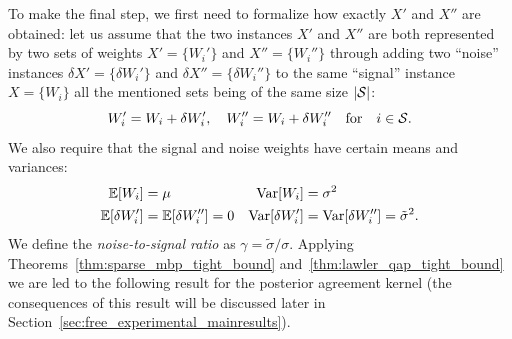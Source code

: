 To make the final step, we first need to formalize how exactly $X'$ and $X''$ are
obtained: let us assume that the two instances $X'$ and $X''$ are both
represented by two sets of weights $X' = \{W_i'\}$ and $X'' =
\{W_i''\}$ through adding two ``noise'' instances $\delta X' = \{\delta W_i'\}$
and $\delta X'' = \{\delta W_i''\}$ to the same ``signal'' instance
$X = \{W_i\}$ all the mentioned sets being of the same size $|\S|$:
\begin{equation}
  W_i' = W_i + \delta W_i', \quad W_i'' = W_i + \delta W_i'' 
    \quad \text{for} \quad i \in \S.
\end{equation}
We also require that the signal and noise weights have certain means and
variances:
\begin{align}
  \Expct [W_i] &= \mu &  \Var [W_i] &= \sigma^2 \\ 
    \Expct [\delta W_i'] &= \Expct [\delta W_i''] = 0 & 
    \Var [\delta W_i'] &= \Var [\delta W_i''] = \tilde \sigma^2.
\end{align}
We define the \textit{noise-to-signal ratio} as $\gamma=\tilde \sigma/\sigma$.
Applying Theorems~\ref{thm:sparse_mbp_tight_bound}
and~\ref{thm:lawler_qap_tight_bound} we are led to the following result for
the posterior agreement kernel (the consequences of this result will be discussed later in
Section~\ref{sec:free_experimental_mainresults}).
%

